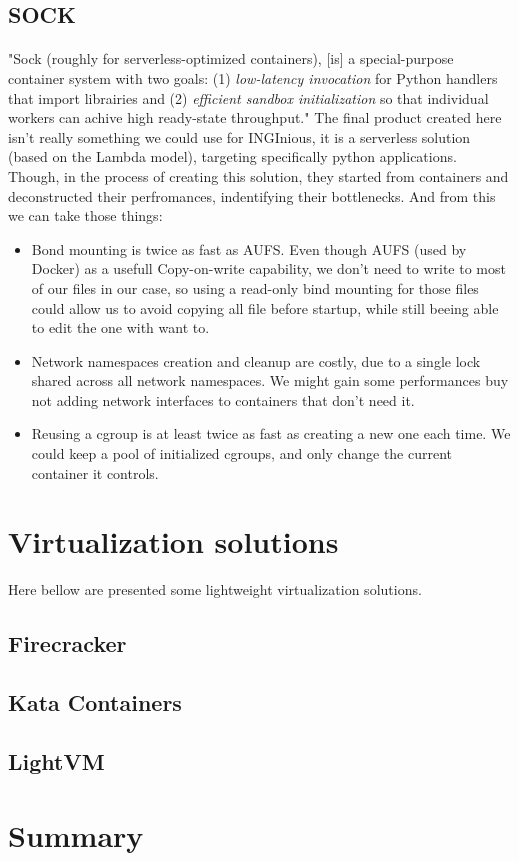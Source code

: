 \subsection{SOCK} 
\paragraph{}"Sock (roughly for serverless-optimized containers), [is] a special-purpose container system with two goals: (1) \textit{low-latency invocation} for Python handlers that import librairies and (2) \textit{efficient sandbox initialization} so that individual workers can achive high ready-state throughput." \cite{oakes2018sock}  The final product created here isn't really something we could use for INGInious, it is a serverless solution (based on the Lambda model), targeting specifically python applications.  Though, in the process of creating this solution, they started from containers and deconstructed their perfromances, indentifying their bottlenecks.  And from this we can take those things:
\begin{itemize}
\renewcommand\labelitemi{--}
  \item Bond mounting is twice as fast as AUFS.  Even though AUFS (used by Docker) as a usefull Copy-on-write capability, we don't need to write to most of our files in our case, so using a read-only bind mounting for those files could allow us to avoid copying all file before startup, while still beeing able to edit the one with want to.
  \item Network namespaces creation and cleanup are costly, due to a single lock shared across all network namespaces.  We might gain some performances buy not adding network interfaces to containers that don't need it.
  \item Reusing a cgroup is at least twice as fast as creating a new one each time.  We could keep a pool of initialized cgroups, and only change the current container it controls.
\end{itemize}

\section{Virtualization solutions}

Here bellow are presented some lightweight virtualization solutions.

\subsection{Firecracker}
\subsection{Kata Containers}
\subsection{LightVM} \cite{manco2017my}

\section{Summary}
